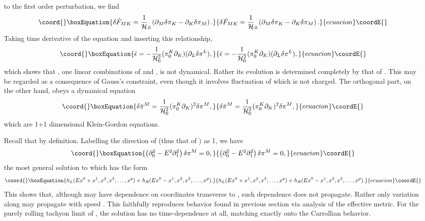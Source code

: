 \documentclass[a4paper,12pt]{article}
\providecommand{\p}{\partial}
\begin{document}
to the first order perturbation, we find
\begin{equation}\coord{}\boxEquation{
\delta \dot F_{MK}=\frac{1}{\cal H}_0
\left(\p_M\delta \pi_K-\p_K\delta \pi_M\right).
}{
\delta \dot F_{MK}=\frac{1}{\cal H}_0
\left(\p_M\delta \pi_K-\p_K\delta \pi_M\right).
}{ecuacion}\coordE{}\end{equation}
Taking time derivative of the \myHighlight{$\pi$}\coordHE{} equation and inserting this
relationship, 
\begin{equation}\coord{}\boxEquation{
\ddot \epsilon = -\frac{1}{{\cal H}_0^2}
(\pi^K_0 \p_K)(\p_L \delta \pi^L),
}{
\ddot \epsilon = -\frac{1}{{\cal H}_0^2}
(\pi^K_0 \p_K)(\p_L \delta \pi^L),
}{ecuacion}\coordE{}\end{equation}
which shows that \coordHE{}, one linear combinations of \coordHE{} and
\coordHE{},  is not dynamical. Rather its evolution is determined completely by
that of  \coordHE{}.  This may be regarded as a consequence of
Gauss's constraint, even though it involves fluctuation of \coordHE{} which is
not charged. The orthogonal part, on the other hand, obeys a dynamical
equation 
\begin{equation}\coord{}\boxEquation{
\delta \ddot \pi^M= \frac{1}{{\cal H}_0^2}(\pi^K_0 \p_K)^2\delta \pi^M ,
}{
\delta \ddot \pi^M= \frac{1}{{\cal H}_0^2}(\pi^K_0 \p_K)^2\delta \pi^M ,
}{ecuacion}\coordE{}\end{equation}
which are 1+1 dimensional Klein-Gordon equations.

Recall that \coordHE{} by definition. Labelling the
direction of \coordHE{} (thus that of \myHighlight{$\vec\pi$}\coordHE{}) as 1, we have
\begin{equation}\coord{}\boxEquation{
\left(\p_0^2 - E^2\p_1^2\right)\delta \pi^M =0 ,
}{
\left(\p_0^2 - E^2\p_1^2\right)\delta \pi^M =0 ,
}{ecuacion}\coordE{}\end{equation}
the most general solution to which has the form
\begin{equation}\coord{}\boxEquation{
h_L(Ex^0+x^1,x^2,x^3,\dots,x^p)+h_R(Ex^0-x^1,x^2,x^3,\dots,x^p).
}{
h_L(Ex^0+x^1,x^2,x^3,\dots,x^p)+h_R(Ex^0-x^1,x^2,x^3,\dots,x^p).
}{ecuacion}\coordE{}\end{equation}
This shows that, although \coordHE{} 
may have dependence on coordinates
transverse to \coordHE{}, such dependence does not propagate.
Rather only variation along \coordHE{} may 
propagate with speed \coordHE{}. This faithfully reproduces behavior found in
previous section via analysis of the effective metric. For the purely
rolling tachyon limit of \coordHE{}, the solution has no time-dependence
at all, matching exactly onto the Carrollian behavior.
\end{document}
